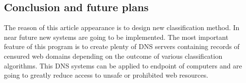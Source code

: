\documentclass[9pt,a4paper]{extarticle}
\begin{document}
\begin{multicols}{2}
\section{Conclusion and future plans}
The reason of this article appearance is to design new classification method. In near future new systems are going to be implemented. The most important feature  of this program is to create plenty of DNS servers containing records of censured web domains depending on the outcome of various classification algorithms. This DNS systems can be applied  to endpoint of computers and are going to greatly reduce access to unsafe or prohibited web resources.


\end{multicols}
\end{document}
